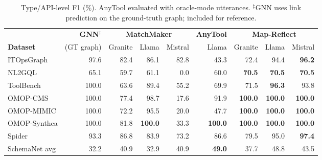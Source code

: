 \documentclass[sigconf, nonacm]{acmart}
\begin{document}
\begin{table}[htbp]
\centering
\small
\setlength{\tabcolsep}{5pt}
\caption{Type/API-level F1 (\%). AnyTool evaluated with oracle-mode utterances. $^\ddagger$GNN uses link prediction on the ground-truth graph; included for reference.}
\label{tab:type_results}
\begin{tabular}{l r rrr r rrr}
\toprule
& \textbf{GNN}$^\ddagger$ & \multicolumn{3}{c}{\textbf{MatchMaker}} & \textbf{AnyTool} & \multicolumn{3}{c}{\textbf{Map-Reflect}} \\
\cmidrule(lr){2-2}\cmidrule(lr){3-5}\cmidrule(lr){6-6}\cmidrule(lr){7-9}
\textbf{Dataset} & (GT graph) & Granite & Llama & Mistral & Llama & Granite & Llama & Mistral \\
\midrule
ITOpsGraph        & 97.6 & 82.4  & 86.1  & 82.8  & 43.3  & 72.4  & 94.4  & \textbf{96.2} \\
NL2GQL            & 65.1 & 59.7  & 61.1  & 0.0   & 60.0  & \textbf{70.5}  & \textbf{70.5}  & \textbf{70.5} \\
ToolBench         & 100.0 & 63.6  & 89.4  & 55.2  & 69.9  & 71.5 & \textbf{96.3}  & 93.8 \\
OMOP-CMS          & 100.0 & 77.4  & 98.7  & 17.6  & 91.9  & \textbf{100.0} & \textbf{100.0} & \textbf{100.0} \\
OMOP-MIMIC        & 100.0 & 72.2  & 95.5  & 20.0  & 47.7  & \textbf{100.0} & \textbf{100.0} & \textbf{100.0} \\
OMOP-Synthea      & 100.0 & 81.8 & \textbf{100.0} & 33.3 & \textbf{100.0} & \textbf{100.0} & \textbf{100.0} & \textbf{100.0} \\
Spider            & 93.3  & 86.8  & 83.9  & 73.2  & 86.6  & 79.5  & 95.0  & \textbf{97.4} \\
SchemaNet avg     & 32.2  & 40.9  & 32.9  & 40.9  & \textbf{49.0}  & 37.7  & 48.8 & 43.5 \\
\bottomrule
\end{tabular}
\end{table}
\end{document}
